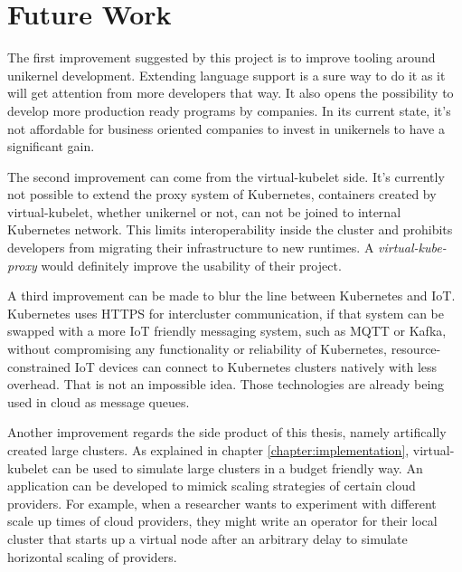 \section{Future Work}
The first improvement suggested by this project is to improve tooling around unikernel development. Extending language support is a sure way to do it as it will get attention from more developers that way. It also opens the possibility to develop more production ready programs by companies. In its current state, it's not affordable for business oriented companies to invest in unikernels to have a significant gain.

The second improvement can come from the virtual-kubelet side. It's currently not possible to extend the proxy system of Kubernetes, containers created by virtual-kubelet, whether unikernel or not, can not be joined to internal Kubernetes network. This limits interoperability inside the cluster and prohibits developers from migrating their infrastructure to new runtimes. A \textit{virtual-kube-proxy} would definitely improve the usability of their project.

A third improvement can be made to blur the line between Kubernetes and IoT. Kubernetes uses HTTPS for intercluster communication, if that system can be swapped with a more IoT friendly messaging system, such as MQTT or Kafka, without compromising any functionality or reliability of Kubernetes, resource-constrained IoT devices can connect to Kubernetes clusters natively with less overhead. That is not an impossible idea. Those technologies are already being used in cloud as message queues.

Another improvement regards the side product of this thesis, namely artifically created large clusters. As explained in chapter \ref{chapter:implementation}, virtual-kubelet can be used to simulate large clusters in a budget friendly way. An application can be developed to mimick scaling strategies of certain cloud providers. For example, when a researcher wants to experiment with different scale up times of cloud providers, they might write an operator for their local cluster that starts up a virtual node after an arbitrary delay to simulate horizontal scaling of providers.